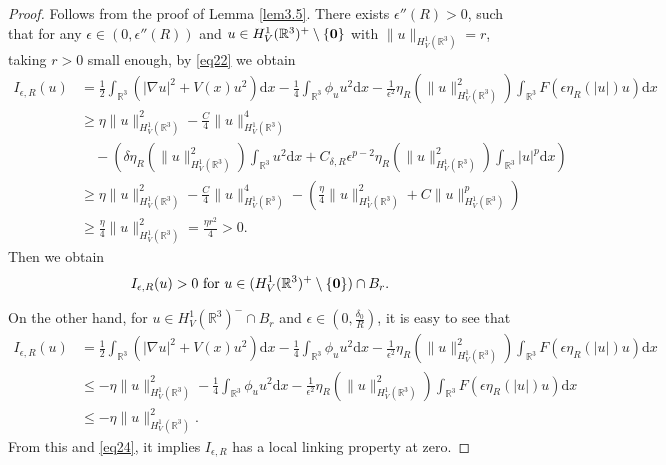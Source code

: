 \documentclass[12pt]{amsart}
\numberwithin{equation}{section}
\theoremstyle{definition}
\begin{document}
\begin{proof}
 Follows from the proof of Lemma \ref{lem3.5}. There exists $\epsilon''(R)>0$, such that for any $\epsilon\in(0,\epsilon''(R))$ and $u\in H^{1}_{V}(\mathbb{R}^3)^{+}\setminus\{\bf 0\}$ with $\|u\|_{H^{1}_{V}(\mathbb{R}^3)}=r$, taking $r>0$ small enough, by \eqref {eq22} we obtain
\begin{equation*}
\begin{aligned}
I_{\epsilon,R}(u)&=\frac{1}{2}\int_{\mathbb R^3}\left(|\nabla u|^2+V(x)u^2\right)\text{d}x-\frac{1}{4}\int_{\mathbb R^3}\phi_{u} u^2\text{d}x-\frac{1}{\epsilon^2}\eta _{R}\left (\|u\|^{2}_{H^1_{V}(\mathbb{R}^3)}\right )\int_{\mathbb{R}^{3}}F\left (\epsilon \eta _{R} \left ( \left | u\right |\right )u\right )\text{d}x\\
&\geq\eta\|u\|^2_{H^{1}_{V}(\mathbb{R}^3)}-\frac{C}{4}\|u\|^4_{H^{1}_{V}(\mathbb{R}^3)}\\
&\quad-\left(\delta\eta _{R}\left ( \|u\|^{2}_{H^1_{V}(\mathbb{R}^3)}\right )\int_{\mathbb{R}^{3}}u^{2}\text{d}x +C_{\delta,R}\epsilon^{p-2}\eta _{R}\left ( \|u\|^{2}_{H^1_{V}(\mathbb{R}^3)}\right )\int_{\mathbb{R}^{3}}\left | u\right |^{p}\text{d}x\right)\\
&\geq\eta\|u\|^2_{H^{1}_{V}(\mathbb{R}^3)}-\frac{C}{4}\|u\|^4_{H^{1}_{V}(\mathbb{R}^3)}-\left(\frac{\eta}{4} \|u\|^2_{H^{1}_{V}(\mathbb{R}^3)} +C\|u\|^p_{H^{1}_{V}(\mathbb{R}^3)}\right)\\
&\geq \frac{\eta}{4}\|u\|^2_{H^{1}_{V}(\mathbb{R}^3)}=\frac{\eta r^2}{4}>0.
\end{aligned}
\end{equation*}
Then we obtain
\begin{equation}\label{eq24}
    I_{\epsilon,R}(u)>0 \  \mbox{for}\ u\in (H^{1}_{V}(\mathbb{R}^3)^{+}\setminus\{{\bf0}\})\cap B_{r}.
\end{equation}

On the other hand, for $u\in H^{1}_{V}(\mathbb{R}^3)^{-}\cap B_{r}$ and $\epsilon\in (0,\frac{\delta_0}{R})$, it is easy to see that
\begin{equation*}
\begin{aligned}
I_{\epsilon,R}(u)&=\frac{1}{2}\int_{\mathbb R^3}\left(|\nabla u|^2+V(x)u^2\right)\text{d}x-\frac{1}{4}\int_{\mathbb R^3}\phi_{u} u^2\text{d}x-\frac{1}{\epsilon^2}\eta _{R}\left (\|u\|^{2}_{H^1_{V}(\mathbb{R}^3)}\right )\int_{\mathbb{R}^{3}}F\left (\epsilon \eta _{R} \left ( \left | u\right |\right )u\right )\text{d}x\\
&\leq-\eta\|u\|^2_{H^{1}_{V}(\mathbb{R}^3)}-\frac{1}{4}\int_{\mathbb R^3}\phi_{u} u^2\text{d}x-\frac{1}{\epsilon^2}\eta _{R}\left (\|u\|^{2}_{H^1_{V}(\mathbb{R}^3)}\right )\int_{\mathbb{R}^{3}}F\left (\epsilon \eta _{R} \left ( \left | u\right |\right )u\right )\text{d}x\\
&\leq-\eta \|u\|^2_{H^{1}_{V}(\mathbb{R}^3)}.
\end{aligned}
\end{equation*}
From this and \eqref{eq24}, it implies $I_{\epsilon,R}$ has a local linking property at zero.
\end{proof}
\end{document}
